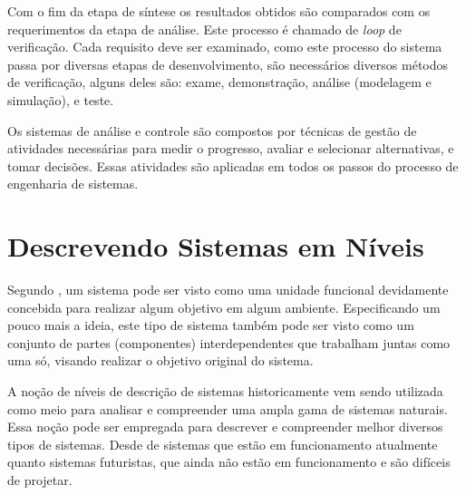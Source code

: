     Com o fim da etapa de síntese os resultados obtidos são comparados com os requerimentos da etapa de análise. Este processo é chamado de \textit{loop} de verificação. Cada requisito deve ser examinado, como este processo do sistema passa por diversas etapas de desenvolvimento, são necessários diversos métodos de verificação, alguns deles são: exame, demonstração, análise (modelagem e simulação), e teste.
    
    Os sistemas de análise e controle são compostos por técnicas de gestão de atividades necessárias para medir o progresso, avaliar e selecionar alternativas, e tomar decisões. Essas atividades são aplicadas em todos os passos do processo de engenharia de sistemas.

\section{Descrevendo Sistemas em Níveis}
\label{sec:abord-def-nivel}

    Segundo \cite{wilensky1999thinking}, um sistema pode ser visto como uma unidade funcional devidamente concebida para realizar algum objetivo em algum ambiente. Especificando um pouco mais a ideia, este tipo de sistema também pode ser visto como um conjunto de partes (componentes) interdependentes que trabalham juntas como uma só, visando realizar o objetivo original do sistema.%
    
    
    A noção de níveis de descrição de sistemas historicamente vem sendo utilizada como meio para analisar e compreender uma ampla gama de sistemas naturais. Essa noção pode ser empregada para descrever e compreender melhor diversos tipos de sistemas. Desde de sistemas que estão em funcionamento atualmente quanto sistemas futuristas, que ainda não estão em funcionamento e são difíceis de projetar.
    
